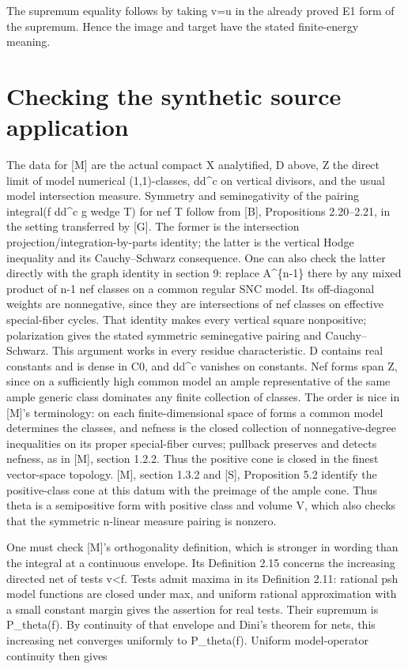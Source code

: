\documentclass[11pt]{article}
\begin{document}
The supremum equality follows by taking v=u in the already proved E1 form of the supremum. Hence the image and target have the stated finite-energy meaning.

\section{Checking the synthetic source application}

The data for [M] are the actual compact X analytified, D above, Z the direct limit of model numerical (1,1)-classes, dd\textasciicircum{}c on vertical divisors, and the usual model intersection measure. Symmetry and seminegativity of the pairing integral(f dd\textasciicircum{}c g wedge T) for nef T follow from [B], Propositions 2.20--2.21, in the setting transferred by [G]. The former is the intersection projection/integration-by-parts identity; the latter is the vertical Hodge inequality and its Cauchy--Schwarz consequence. One can also check the latter directly with the graph identity in section 9: replace A\textasciicircum{}\{n-1\} there by any mixed product of n-1 nef classes on a common regular SNC model. Its off-diagonal weights are nonnegative, since they are intersections of nef classes on effective special-fiber cycles. That identity makes every vertical square nonpositive; polarization gives the stated symmetric seminegative pairing and Cauchy--Schwarz. This argument works in every residue characteristic. D contains real constants and is dense in C0, and dd\textasciicircum{}c vanishes on constants. Nef forms span Z, since on a sufficiently high common model an ample representative of the same ample generic class dominates any finite collection of classes. The order is nice in [M]'s terminology: on each finite-dimensional space of forms a common model determines the classes, and nefness is the closed collection of nonnegative-degree inequalities on its proper special-fiber curves; pullback preserves and detects nefness, as in [M], section 1.2.2. Thus the positive cone is closed in the finest vector-space topology. [M], section 1.3.2 and [S], Proposition 5.2 identify the positive-class cone at this datum with the preimage of the ample cone. Thus theta is a semipositive form with positive class and volume V, which also checks that the symmetric n-linear measure pairing is nonzero.

One must check [M]'s orthogonality definition, which is stronger in wording than the integral at a continuous envelope. Its Definition 2.15 concerns the increasing directed net of tests v\textless{}f. Tests admit maxima in its Definition 2.11: rational psh model functions are closed under max, and uniform rational approximation with a small constant margin gives the assertion for real tests. Their supremum is P\_theta(f). By continuity of that envelope and Dini's theorem for nets, this increasing net converges uniformly to P\_theta(f). Uniform model-operator continuity then gives
\end{document}
